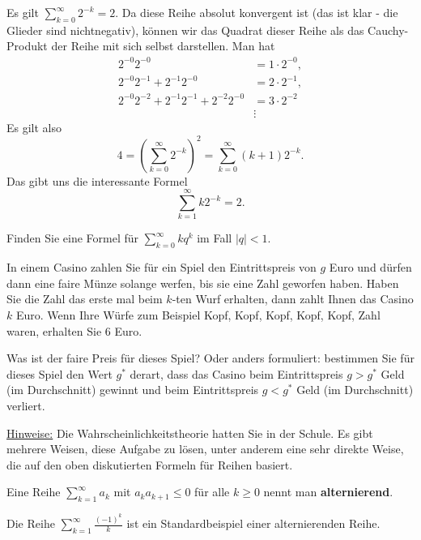 \begin{bsp} 
	Es gilt $\sum_{k=0}^\infty 2^{-k} =  2$. Da diese Reihe absolut konvergent ist (das ist klar - die Glieder sind nichtnegativ), können wir das Quadrat dieser Reihe als das Cauchy-Produkt der Reihe mit sich selbst  darstellen. Man hat 
	\begin{align*} 
		 2^{-0} 2^{-0} & = 1 \cdot 2^{-0}, 
		\\ 2^{-0} 2^{-1} + 2^{-1} 2^{-0} & = 2 \cdot 2^{-1}, 
		\\ 2^{-0} 2^{-2} + 2^{-1} 2^{-1} + 2^{-2} 2^{-0} & = 3 \cdot 2^{-2}
		\\ & \vdots 
	\end{align*}
	Es gilt also 
	\[
		4 = \left( \sum_{k=0}^\infty 2^{-k} \right)^2 = \sum_{k=0}^\infty (k+1) 2^{-k}.
	\]
	Das gibt uns die interessante Formel
	\[
		\sum_{k=1}^\infty k 2^{-k} = 2. 
	\]
\end{bsp} 

\begin{aufg} 
	Finden Sie eine Formel für $\sum_{k=0}^\infty k q^k$ im Fall $|q| < 1$. 
\end{aufg} 

\begin{aufg} 
	In einem Casino zahlen Sie für ein Spiel den Eintrittspreis von $g$ Euro und dürfen dann eine faire Münze solange werfen, bis sie eine Zahl geworfen haben. Haben Sie die Zahl das erste mal beim  $k$-ten Wurf erhalten, dann zahlt Ihnen das Casino $k$ Euro. Wenn Ihre Würfe zum Beispiel  Kopf, Kopf, Kopf, Kopf, Kopf, Zahl  waren, erhalten Sie $6$ Euro. 
	
	Was ist der faire Preis für dieses Spiel? Oder anders formuliert: bestimmen Sie für dieses Spiel den Wert $g^\ast$ derart, dass das Casino beim Eintrittspreis $g>g^\ast$ Geld (im Durchschnitt) gewinnt und beim Eintrittspreis $g<g^\ast$ Geld (im Durchschnitt) verliert. 
	
	\underline{Hinweise:} Die Wahrscheinlichkeitstheorie hatten Sie in der Schule. Es gibt mehrere Weisen, diese Aufgabe zu lösen, unter anderem eine sehr direkte Weise, die auf den oben diskutierten Formeln für Reihen basiert. 
\end{aufg} 

\begin{defn}
	Eine Reihe $\sum_{k=1}^\infty a_k$ mit $a_k a_{k+1} \le 0$ für alle $k \ge 0$ nennt man \textbf{alternierend}. 
\end{defn} 


\begin{bsp}
	Die Reihe $\sum_{k=1}^\infty \frac{(-1)^k}{k}$ ist ein Standardbeispiel einer alternierenden Reihe. 
\end{bsp} 

